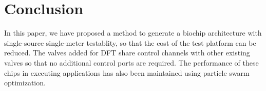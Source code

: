 \section{Conclusion}\label{sec:conclusion} 
In this paper, we have proposed a
method to generate a biochip architecture with single-source single-meter
testablity, so that the cost of the test platform can be reduced. The valves
added for DFT share control channels with other existing valves so that no
additional control ports are required. The performance of these chips in
executing applications has also been maintained using  
particle swarm optimization.

